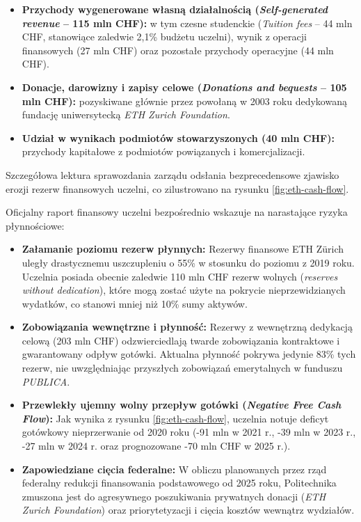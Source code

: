 \begin{itemize}
\begin{itemize}
\begin{itemize}
        \end{itemize}
        \item \textbf{Przychody wygenerowane własną działalnością (\textit{Self-generated revenue} -- 115 mln CHF):} w tym czesne studenckie (\textit{Tuition fees} -- 44 mln CHF, stanowiące zaledwie 2,1\% budżetu uczelni), wynik z operacji finansowych (27 mln CHF) oraz pozostałe przychody operacyjne (44 mln CHF).
        \item \textbf{Donacje, darowizny i zapisy celowe (\textit{Donations and bequests} -- 105 mln CHF):} pozyskiwane głównie przez powołaną w 2003 roku dedykowaną fundację uniwersytecką \textit{ETH Zurich Foundation}.
        \item \textbf{Udział w wynikach podmiotów stowarzyszonych (40 mln CHF):} przychody kapitałowe z podmiotów powiązanych i komercjalizacji.
    \end{itemize}
\end{itemize}


Szczegółowa lektura sprawozdania zarządu odsłania bezprecedensowe zjawisko erozji rezerw finansowych uczelni, co zilustrowano na rysunku \ref{fig:eth-cash-flow}.


Oficjalny raport finansowy uczelni bezpośrednio wskazuje na narastające ryzyka płynnościowe:
\begin{itemize}
    \item \textbf{Załamanie poziomu rezerw płynnych:} Rezerwy finansowe ETH Zürich uległy drastycznemu uszczupleniu o 55\% w stosunku do poziomu z 2019 roku. Uczelnia posiada obecnie zaledwie 110 mln CHF rezerw wolnych (\textit{reserves without dedication}), które mogą zostać użyte na pokrycie nieprzewidzianych wydatków, co stanowi mniej niż 10\% sumy aktywów.
    \item \textbf{Zobowiązania wewnętrzne i płynność:} Rezerwy z wewnętrzną dedykacją celową (203 mln CHF) odzwierciedlają twarde zobowiązania kontraktowe i gwarantowany odpływ gotówki. Aktualna płynność pokrywa jedynie 83\% tych rezerw, nie uwzględniając przyszłych zobowiązań emerytalnych w funduszu \textit{PUBLICA}.
    \item \textbf{Przewlekły ujemny wolny przepływ gotówki (\textit{Negative Free Cash Flow}):} Jak wynika z rysunku \ref{fig:eth-cash-flow}, uczelnia notuje deficyt gotówkowy nieprzerwanie od 2020 roku (-91 mln w 2021 r., -39 mln w 2023 r., -27 mln w 2024 r. oraz prognozowane -70 mln CHF w 2025 r.).
    \item \textbf{Zapowiedziane cięcia federalne:} W obliczu planowanych przez rząd federalny redukcji finansowania podstawowego od 2025 roku, Politechnika zmuszona jest do agresywnego poszukiwania prywatnych donacji (\textit{ETH Zurich Foundation}) oraz priorytetyzacji i cięcia kosztów wewnątrz wydziałów.
\end{itemize}

